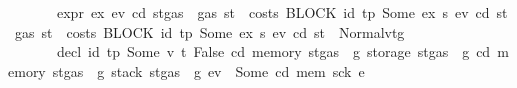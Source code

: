\begin{isabellebody}
\ \ \ \ \ \ \ {\isachardoublequoteopen}expr\ ex{\isacharprime}{\kern0pt}\ ev\ cd\ {\isacharparenleft}{\kern0pt}st{\isasymlparr}gas\ {\isacharcolon}{\kern0pt}{\isacharequal}{\kern0pt}\ gas\ st\ {\isacharminus}{\kern0pt}\ costs\ {\isacharparenleft}{\kern0pt}BLOCK\ {\isacharparenleft}{\kern0pt}{\isacharparenleft}{\kern0pt}id{}{\isacharcomma}{\kern0pt}\ tp{\isacharparenright}{\kern0pt}{\isacharcomma}{\kern0pt}\ Some\ ex{\isacharprime}{\kern0pt}{\isacharparenright}{\kern0pt}\ s{\isacharparenright}{\kern0pt}\ ev\ cd\ st{\isasymrparr}{\isacharparenright}{\kern0pt}\ {\isacharparenleft}{\kern0pt}gas\ st\ {\isacharminus}{\kern0pt}\ costs\ {\isacharparenleft}{\kern0pt}BLOCK\ {\isacharparenleft}{\kern0pt}{\isacharparenleft}{\kern0pt}id{}{\isacharcomma}{\kern0pt}\ tp{\isacharparenright}{\kern0pt}{\isacharcomma}{\kern0pt}\ Some\ ex{\isacharprime}{\kern0pt}{\isacharparenright}{\kern0pt}\ s{\isacharparenright}{\kern0pt}\ ev\ cd\ st{\isacharparenright}{\kern0pt}\ {\isacharequal}{\kern0pt}\ Normal{\isacharparenleft}{\kern0pt}{\isacharparenleft}{\kern0pt}v{\isacharcomma}{\kern0pt}t{\isacharparenright}{\kern0pt}{\isacharcomma}{\kern0pt}g{\isacharparenright}{\kern0pt}{\isachardoublequoteclose}\isanewline
\ \ \ \ \ \ \ {\isachardoublequoteopen}decl\ id{}\ tp\ {\isacharparenleft}{\kern0pt}Some\ {\isacharparenleft}{\kern0pt}v{\isacharcomma}{\kern0pt}\ t{\isacharparenright}{\kern0pt}{\isacharparenright}{\kern0pt}\ False\ cd\ {\isacharparenleft}{\kern0pt}memory\ {\isacharparenleft}{\kern0pt}st{\isasymlparr}gas\ {\isacharcolon}{\kern0pt}{\isacharequal}{\kern0pt}\ g{\isasymrparr}{\isacharparenright}{\kern0pt}{\isacharparenright}{\kern0pt}\ {\isacharparenleft}{\kern0pt}storage\ {\isacharparenleft}{\kern0pt}st{\isasymlparr}gas\ {\isacharcolon}{\kern0pt}{\isacharequal}{\kern0pt}\ g{\isasymrparr}{\isacharparenright}{\kern0pt}{\isacharparenright}{\kern0pt}\ {\isacharparenleft}{\kern0pt}cd{\isacharcomma}{\kern0pt}\ memory\ {\isacharparenleft}{\kern0pt}st{\isasymlparr}gas\ {\isacharcolon}{\kern0pt}{\isacharequal}{\kern0pt}\ g{\isasymrparr}{\isacharparenright}{\kern0pt}{\isacharcomma}{\kern0pt}\ stack\ {\isacharparenleft}{\kern0pt}st{\isasymlparr}gas\ {\isacharcolon}{\kern0pt}{\isacharequal}{\kern0pt}\ g{\isasymrparr}{\isacharparenright}{\kern0pt}{\isacharcomma}{\kern0pt}\ ev{\isacharparenright}{\kern0pt}\ {\isacharequal}{\kern0pt}\ Some\ {\isacharparenleft}{\kern0pt}cd{\isacharprime}{\kern0pt}{\isacharcomma}{\kern0pt}\ mem{\isacharprime}{\kern0pt}{\isacharcomma}{\kern0pt}\ sck{\isacharprime}{\kern0pt}{\isacharcomma}{\kern0pt}\ e{\isacharprime}{\kern0pt}{\isacharparenright}{\kern0pt}{\isachardoublequoteclose}\isanewline

\end{isabellebody}
